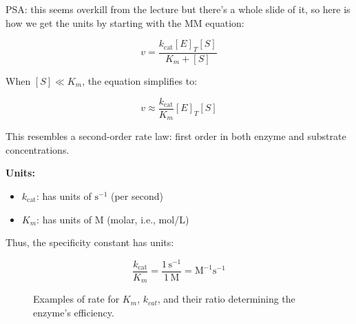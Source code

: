 \documentclass[../main.tex]{subfiles}
\begin{document}
PSA: this seems overkill from the lecture but there's a whole slide of it, so here is how we get the units by starting with the MM equation:

\begin{equation}
	v = \frac{k_{\text{cat}} [E]_T [S]}{K_m + [S]}
\end{equation}

When \( [S] \ll K_m \), the equation simplifies to:

\begin{equation}
	v \approx \frac{k_{\text{cat}}}{K_m} [E]_T [S]
\end{equation}

This resembles a second-order rate law: first order in both enzyme and substrate concentrations.

\bigskip

\textbf{Units:}
\begin{itemize}
	\item \( k_{\text{cat}} \): has units of \( \text{s}^{-1} \) (per second)
	\item \( K_m \): has units of \( \text{M} \) (molar, i.e., mol/L)
\end{itemize}

Thus, the specificity constant has units:

\begin{equation}
	\frac{k_{\text{cat}}}{K_m} = \frac{1\, \text{s}^{-1}}{1\, \text{M}} = \text{M}^{-1}\text{s}^{-1}
\end{equation}

\begin{figure}[h]
	\centering
	\hfill
	\caption{Examples of rate for $K_{m}$, $k_{cat}$, and their ratio determining the enzyme's efficiency.}
\end{figure}
\end{document}
